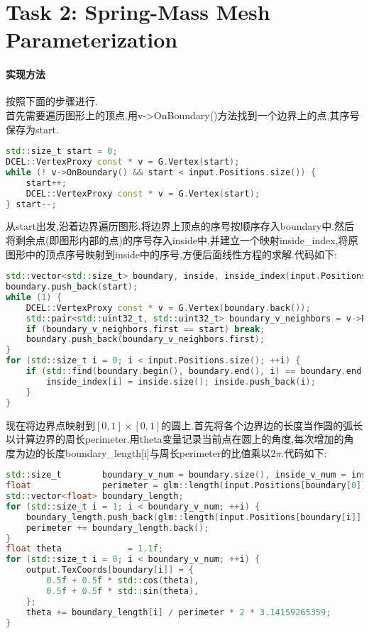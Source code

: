 \documentclass{ctexart}
\begin{document}
\section*{Task 2: Spring-Mass Mesh Parameterization}
\paragraph{实现方法}
按照下面的步骤进行.\\
\indent 首先需要遍历图形上的顶点,用{\codefont v->OnBoundary()}方法找到一个边界上的点,其序号保存为{\codefont start}.
\begin{lstlisting}[language=C++]
std::size_t start = 0;
DCEL::VertexProxy const * v = G.Vertex(start);
while (! v->OnBoundary() && start < input.Positions.size()) {
    start++;
    DCEL::VertexProxy const * v = G.Vertex(start);
} start--;
\end{lstlisting}
\indent 从{\codefont start}出发,沿着边界遍历图形,将边界上顶点的序号按顺序存入{\codefont boundary}中.然后将剩余点(即图形内部的点)的序号存入{\codefont inside}中,并建立一个映射{\codefont inside\_index},将原图形中的顶点序号映射到{\codefont inside}中的序号,方便后面线性方程的求解.代码如下:
\begin{lstlisting}[language=C++]
std::vector<std::size_t> boundary, inside, inside_index(input.Positions.size(), 0);
boundary.push_back(start);
while (1) {
    DCEL::VertexProxy const * v = G.Vertex(boundary.back());
    std::pair<std::uint32_t, std::uint32_t> boundary_v_neighbors = v->BoundaryNeighbors();
    if (boundary_v_neighbors.first == start) break;
    boundary.push_back(boundary_v_neighbors.first);
}
for (std::size_t i = 0; i < input.Positions.size(); ++i) {
    if (std::find(boundary.begin(), boundary.end(), i) == boundary.end()) {
        inside_index[i] = inside.size(); inside.push_back(i);
    }
}
\end{lstlisting}
现在将边界点映射到$[0,1]\times[0,1]$的圆上.首先将各个边界边的长度当作圆的弧长以计算边界的周长{\codefont perimeter}.用{\codefont theta}变量记录当前点在圆上的角度,每次增加的角度为边的长度{\codefont boundary\_length[i]}与周长{\codefont perimeter}的比值乘以$2\pi$.代码如下:
\begin{lstlisting}[language=C++]
std::size_t        boundary_v_num = boundary.size(), inside_v_num = inside.size();
float              perimeter = glm::length(input.Positions[boundary[0]] - input.Positions[boundary.back()]);
std::vector<float> boundary_length;
for (std::size_t i = 1; i < boundary_v_num; ++i) {
    boundary_length.push_back(glm::length(input.Positions[boundary[i]] - input.Positions[boundary[i - 1]]));
    perimeter += boundary_length.back();
}
float theta             = 1.1f;
for (std::size_t i = 0; i < boundary_v_num; ++i) {
    output.TexCoords[boundary[i]] = {
        0.5f + 0.5f * std::cos(theta),
        0.5f + 0.5f * std::sin(theta),
    };
    theta += boundary_length[i] / perimeter * 2 * 3.14159265359;
}
\end{lstlisting}
\end{document}
